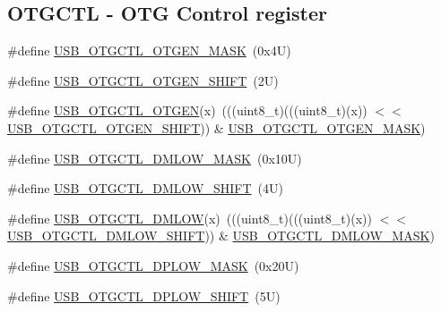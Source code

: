 \subsection*{O\+T\+G\+C\+TL -\/ O\+TG Control register}
\begin{DoxyCompactItemize}
\item 
\#define \mbox{\hyperlink{group___u_s_b___register___masks_ga6cdb9b59615dfc774914e37d44f17e3a}{U\+S\+B\+\_\+\+O\+T\+G\+C\+T\+L\+\_\+\+O\+T\+G\+E\+N\+\_\+\+M\+A\+SK}}~(0x4\+U)
\item 
\#define \mbox{\hyperlink{group___u_s_b___register___masks_ga45ccee22440e024d6e6096d5607372f6}{U\+S\+B\+\_\+\+O\+T\+G\+C\+T\+L\+\_\+\+O\+T\+G\+E\+N\+\_\+\+S\+H\+I\+FT}}~(2\+U)
\item 
\#define \mbox{\hyperlink{group___u_s_b___register___masks_ga5e783e811c3f041573490362baacb723}{U\+S\+B\+\_\+\+O\+T\+G\+C\+T\+L\+\_\+\+O\+T\+G\+EN}}(x)~(((uint8\+\_\+t)(((uint8\+\_\+t)(x)) $<$$<$ \mbox{\hyperlink{group___u_s_b___register___masks_ga45ccee22440e024d6e6096d5607372f6}{U\+S\+B\+\_\+\+O\+T\+G\+C\+T\+L\+\_\+\+O\+T\+G\+E\+N\+\_\+\+S\+H\+I\+FT}})) \& \mbox{\hyperlink{group___u_s_b___register___masks_ga6cdb9b59615dfc774914e37d44f17e3a}{U\+S\+B\+\_\+\+O\+T\+G\+C\+T\+L\+\_\+\+O\+T\+G\+E\+N\+\_\+\+M\+A\+SK}})
\item 
\#define \mbox{\hyperlink{group___u_s_b___register___masks_ga929467feea7b1506c205dd78112a8a98}{U\+S\+B\+\_\+\+O\+T\+G\+C\+T\+L\+\_\+\+D\+M\+L\+O\+W\+\_\+\+M\+A\+SK}}~(0x10\+U)
\item 
\#define \mbox{\hyperlink{group___u_s_b___register___masks_ga11854093d47631b4f11f0c50bf7a063f}{U\+S\+B\+\_\+\+O\+T\+G\+C\+T\+L\+\_\+\+D\+M\+L\+O\+W\+\_\+\+S\+H\+I\+FT}}~(4\+U)
\item 
\#define \mbox{\hyperlink{group___u_s_b___register___masks_ga6e3236832190e5a0774872244aab3223}{U\+S\+B\+\_\+\+O\+T\+G\+C\+T\+L\+\_\+\+D\+M\+L\+OW}}(x)~(((uint8\+\_\+t)(((uint8\+\_\+t)(x)) $<$$<$ \mbox{\hyperlink{group___u_s_b___register___masks_ga11854093d47631b4f11f0c50bf7a063f}{U\+S\+B\+\_\+\+O\+T\+G\+C\+T\+L\+\_\+\+D\+M\+L\+O\+W\+\_\+\+S\+H\+I\+FT}})) \& \mbox{\hyperlink{group___u_s_b___register___masks_ga929467feea7b1506c205dd78112a8a98}{U\+S\+B\+\_\+\+O\+T\+G\+C\+T\+L\+\_\+\+D\+M\+L\+O\+W\+\_\+\+M\+A\+SK}})
\item 
\#define \mbox{\hyperlink{group___u_s_b___register___masks_gad6a988a0338aa5fcd511f9644b2375eb}{U\+S\+B\+\_\+\+O\+T\+G\+C\+T\+L\+\_\+\+D\+P\+L\+O\+W\+\_\+\+M\+A\+SK}}~(0x20\+U)
\item 
\#define \mbox{\hyperlink{group___u_s_b___register___masks_ga94318731712f5399af57fefe46ac8cec}{U\+S\+B\+\_\+\+O\+T\+G\+C\+T\+L\+\_\+\+D\+P\+L\+O\+W\+\_\+\+S\+H\+I\+FT}}~(5\+U)

\end{DoxyCompactItemize}
